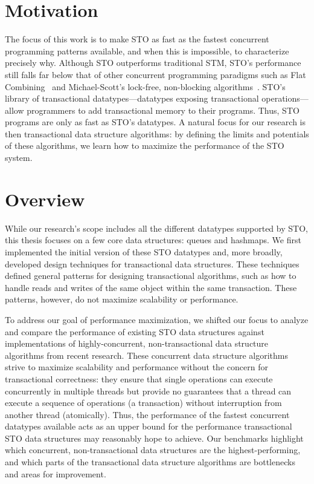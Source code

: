 \section{Motivation}
The focus of this work is to make STO as fast as the fastest concurrent programming patterns available, and when this is impossible, to characterize precisely why. Although STO outperforms traditional STM, STO’s performance still falls far below that of other concurrent programming paradigms such as Flat Combining~\cite{flatcombining} and Michael-Scott's lock-free, non-blocking algorithms~\cite{queue1}. STO’s library of transactional datatypes---datatypes exposing transactional operations---allow programmers to add transactional memory to their programs. Thus, STO programs are only as fast as STO's datatypes. A natural focus for our research is then transactional data structure algorithms: by defining the limits and potentials of these algorithms, we learn how to maximize the performance of the STO system.

\section{Overview}
While our research's scope includes all the different datatypes supported by STO, this thesis focuses on a few core data structures: queues and hashmaps. We first implemented the initial version of these STO datatypes and, more broadly, developed design techniques for transactional data structures. These techniques defined general patterns for designing transactional algorithms, such as how to handle reads and writes of the same object within the same transaction. These patterns, however, do not maximize scalability or performance.

To address our goal of performance maximization, we shifted our focus to analyze and compare the performance of existing STO data structures against implementations of highly-concurrent, non-transactional data structure algorithms from recent research. These concurrent data structure algorithms strive to maximize scalability and performance without the concern for transactional correctness: they ensure that single operations can execute concurrently in multiple threads but provide no guarantees that a thread can execute a sequence of operations (a transaction) without interruption from another thread (atomically).
Thus, the performance of the fastest concurrent datatypes available acts as an upper bound for the performance transactional STO data structures may reasonably hope to achieve. Our benchmarks highlight which concurrent, non-transactional data structures are the highest-performing, and which parts of the transactional data structure algorithms are bottlenecks and areas for improvement. 

